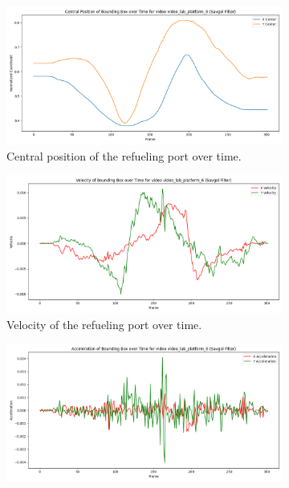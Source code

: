 \documentclass[12pt,oneside]{book} %
\begin{document}
\begin{figure}[H]
    \centering
    \begin{subfigure}[t]{0.6\textwidth}
        \includegraphics[width=\textwidth]{figures/bbox_metrics/video_lab_platform_6 (Savgol Filter)_central_position.png}
        \caption{Central position of the refueling port over time.}
        \label{fig:central-position-test-video_lab_platform_6-savgol}
    \end{subfigure}
    \hfill
    \begin{subfigure}[t]{0.6\textwidth}
        \includegraphics[width=\textwidth]{figures/bbox_metrics/video_lab_platform_6 (Savgol Filter)_velocity.png}
        \caption{Velocity of the refueling port over time.}
        \label{fig:velocity-test-video_lab_platform_6-savgol}
    \end{subfigure}
    \vfill
    \begin{subfigure}[t]{0.6\textwidth}
        \includegraphics[width=\textwidth]{figures/bbox_metrics/video_lab_platform_6 (Savgol Filter)_acceleration.png}

\end{subfigure}
\end{figure}
\end{document}
